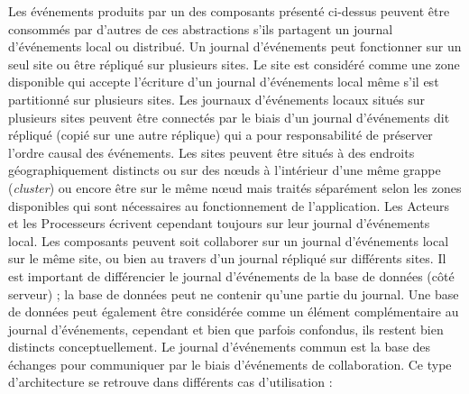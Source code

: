 Les événements produits par un des composants présenté ci-dessus
peuvent être consommés par d'autres de ces abstractions s'ils partagent un 
journal d'événements local ou distribué. Un journal d'événements peut 
fonctionner sur un seul site ou être répliqué 
sur plusieurs sites. 
Le site est considéré comme une zone disponible qui accepte 
l'écriture d'un journal d'événements local même s'il est partitionné sur plusieurs 
sites. Les journaux d'événements locaux situés sur plusieurs sites peuvent être 
connectés par le biais d'un journal d'événements dit \og répliqué\fg{} (copié sur une 
autre réplique) qui a pour responsabilité de préserver l'ordre causal des 
événements.
Les sites peuvent être situés à des endroits géographiquement distincts ou sur 
des nœuds à l'intérieur d'une même grappe (\textit{cluster}) ou encore être sur le 
même nœud mais traités séparément selon les zones 
disponibles qui sont nécessaires au fonctionnement de l'application. 
Les Acteurs et les Processeurs écrivent cependant toujours sur leur journal 
d'événements local. 
Les composants peuvent soit collaborer sur un journal d'événements local sur le 
même site, ou bien au travers d'un journal répliqué sur différents sites.
Il est important de différencier le journal d'événements de la base de données 
(côté serveur) ; la base de données peut ne contenir qu'une partie du journal. 
Une base de données peut également être considérée comme un élément 
complémentaire au journal d'événements, cependant et bien que parfois 
confondus, ils restent bien distincts conceptuellement.
Le journal d'événements commun est la base des échanges pour communiquer 
par le biais d'événements de collaboration. Ce type d'architecture se retrouve dans 
différents cas d'utilisation :
